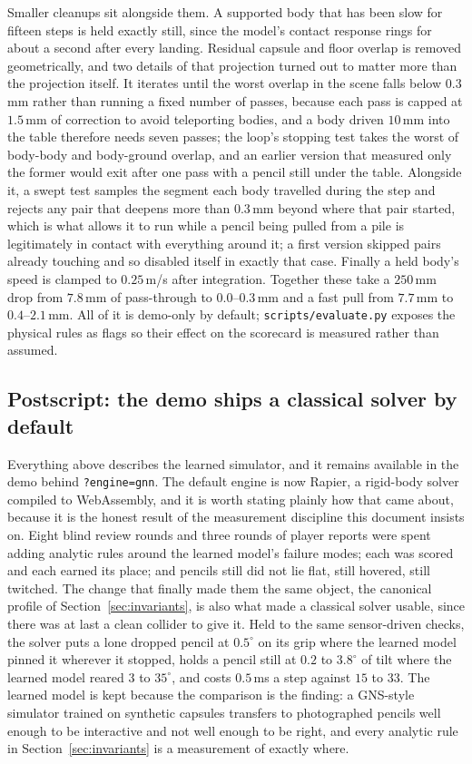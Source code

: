 \documentclass[11pt]{article}
\begin{document}
Smaller cleanups sit alongside them. A supported body that has been slow for fifteen steps is held exactly still, since the model's contact response rings for about a second after every landing. Residual capsule and floor overlap is removed geometrically, and two details of that projection turned out to matter more than the projection itself. It iterates until the worst overlap in the scene falls below $0.3$\,mm rather than running a fixed number of passes, because each pass is capped at $1.5$\,mm of correction to avoid teleporting bodies, and a body driven $10$\,mm into the table therefore needs seven passes; the loop's stopping test takes the worst of body-body and body-ground overlap, and an earlier version that measured only the former would exit after one pass with a pencil still under the table. Alongside it, a swept test samples the segment each body travelled during the step and rejects any pair that deepens more than $0.3$\,mm beyond where that pair started, which is what allows it to run while a pencil being pulled from a pile is legitimately in contact with everything around it; a first version skipped pairs already touching and so disabled itself in exactly that case. Finally a held body's speed is clamped to $0.25$\,m/s after integration. Together these take a $250$\,mm drop from $7.8$\,mm of pass-through to $0.0$--$0.3$\,mm and a fast pull from $7.7$\,mm to $0.4$--$2.1$\,mm. All of it is demo-only by default; \texttt{scripts/evaluate.py} exposes the physical rules as flags so their effect on the scorecard is measured rather than assumed.

\subsection{Postscript: the demo ships a classical solver by default}
\label{sec:solver}
Everything above describes the learned simulator, and it remains available in the demo behind \texttt{?engine=gnn}. The default engine is now Rapier, a rigid-body solver compiled to WebAssembly, and it is worth stating plainly how that came about, because it is the honest result of the measurement discipline this document insists on. Eight blind review rounds and three rounds of player reports were spent adding analytic rules around the learned model's failure modes; each was scored and each earned its place; and pencils still did not lie flat, still hovered, still twitched. The change that finally made them the same object, the canonical profile of Section~\ref{sec:invariants}, is also what made a classical solver usable, since there was at last a clean collider to give it. Held to the same sensor-driven checks, the solver puts a lone dropped pencil at $0.5^\circ$ on its grip where the learned model pinned it wherever it stopped, holds a pencil still at $0.2$ to $3.8^\circ$ of tilt where the learned model reared $3$ to $35^\circ$, and costs $0.5$\,ms a step against $15$ to $33$. The learned model is kept because the comparison is the finding: a GNS-style simulator trained on synthetic capsules transfers to photographed pencils well enough to be interactive and not well enough to be right, and every analytic rule in Section~\ref{sec:invariants} is a measurement of exactly where.
\end{document}
